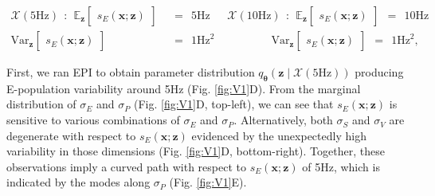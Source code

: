 \documentclass[11pt]{article}
\begin{document}
\begin{equation}\label{eq:EP_V1}
\begin{split}
\mathcal{X}(5\text{Hz}) ~~:~~  \mathbb{E}_{\mathbf{z}}\begin{bmatrix} s_E(\mathbf{x}; \mathbf{z}) \end{bmatrix}  &~~=~~ 5\text{Hz}~~~~~~~\mathcal{X}(10\text{Hz}) ~~:~~  \mathbb{E}_{\mathbf{z}}\begin{bmatrix} s_E(\mathbf{x}; \mathbf{z}) \end{bmatrix}  ~~=~~ 10\text{Hz}  \\ 
 \text{Var}_{\mathbf{z}}\begin{bmatrix} s_E(\mathbf{x}; \mathbf{z}) \end{bmatrix}  &~~=~~  1 \text{Hz}^2~~~~~~~~~~~~~~~~~~~~~~~ \text{Var}_{\mathbf{z}}\begin{bmatrix} s_E(\mathbf{x}; \mathbf{z}) \end{bmatrix}  ~~=~~  1 \text{Hz}^2,
\end{split}
\end{equation}

First, we ran EPI to obtain parameter distribution $q_{\bm{\theta}}(\mathbf{z} \mid \mathcal{X}(5\text{Hz}))$ producing E-population variability around 5Hz (Fig. \ref{fig:V1}D).
From the marginal distribution of $\sigma_E$ and $\sigma_P$ (Fig. \ref{fig:V1}D, top-left), we can see that $s_E(\mathbf{x}; \mathbf{z})$ is sensitive to various combinations of $\sigma_E$ and $\sigma_P$.
Alternatively, both $\sigma_S$ and $\sigma_V$ are degenerate with respect to $s_E(\mathbf{x}; \mathbf{z})$ evidenced by the unexpectedly high variability in those dimensions (Fig. \ref{fig:V1}D, bottom-right).
Together, these observations imply a curved path with respect to $s_E(\mathbf{x}; \mathbf{z})$ of 5Hz, which is indicated by the modes along $\sigma_P$ (Fig. \ref{fig:V1}E).
\end{document}
